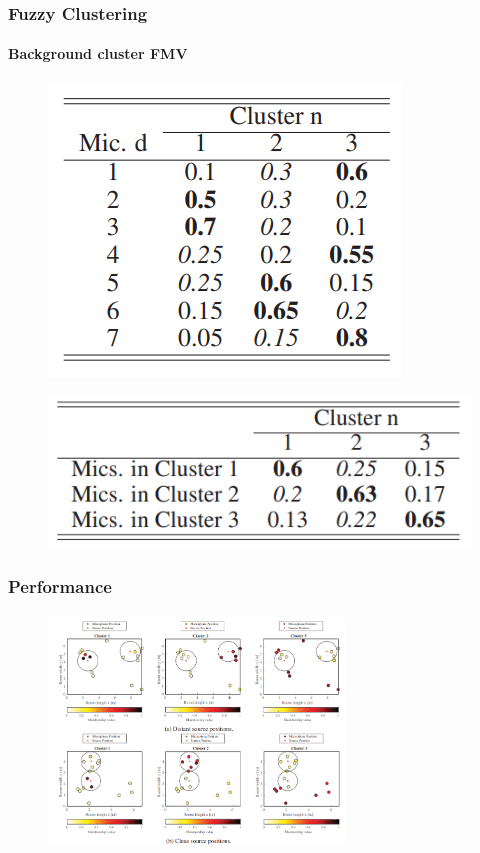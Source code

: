 \documentclass[aspectratio=169]{beamer}
\begin{document}
\begin{frame}
    \frametitle{Fuzzy Clustering}
    \framesubtitle{Background cluster FMV}
    \begin{figure}
        \centering
        \begin{minipage}{.5\textwidth}
          \centering
          \includegraphics[width=.5\linewidth]{images/fmv1.png}
          \label{fig:test1}
        \end{minipage}%
        \begin{minipage}{.5\textwidth}
          \centering
          \includegraphics[width=.5\linewidth]{images/fmv2.png}
          \label{fig:test2}
        \end{minipage}
        \end{figure}
\end{frame}

\begin{frame}
    \frametitle{Performance}
    \framesubtitle{}
    \begin{figure}
          \includegraphics[width=0.7\textwidth]{images/background_clusters.png}
        \end{figure}
\end{frame}
\end{document}
